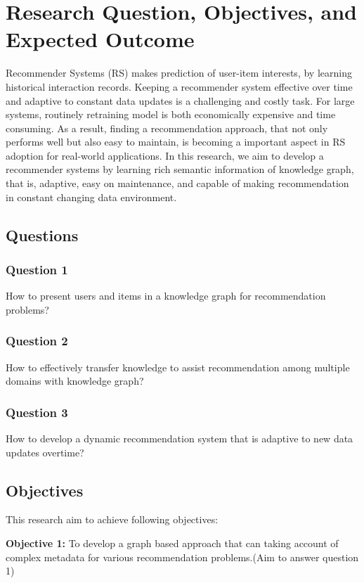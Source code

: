 
\section{Research Question, Objectives, and Expected Outcome}

Recommender Systems (RS) makes prediction of user-item interests, by learning historical interaction records. Keeping a recommender system effective over time and adaptive to constant data updates is a challenging and costly task. For large systems, routinely retraining model is both economically expensive and time consuming. As a result, finding a recommendation approach, that not only performs well but also easy to maintain, is becoming a important aspect in RS adoption for real-world applications.
In this research, we aim to develop a recommender systems by learning rich semantic information of knowledge graph, that is, adaptive, easy on maintenance, and capable of making recommendation in constant changing data environment. 

\subsection{Questions}

\subsubsection*{Question 1}
How to present users and items in a knowledge graph for recommendation problems?

\subsubsection*{Question 2}
How to effectively transfer knowledge to assist recommendation among multiple domains with knowledge graph?

\subsubsection*{Question 3}
How to develop a dynamic recommendation system that is adaptive to new data updates overtime?

\subsection{Objectives}
This research aim to achieve following objectives: 

\bigskip
\textbf{Objective 1:} To develop a graph based approach that can taking account of complex metadata for various recommendation problems.(Aim to answer question 1)


